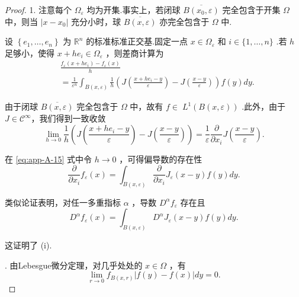 \begin{proof}
1. 注意每个 ${\Omega }_{\varepsilon }$ 均为开集.事实上，若闭球 $\overline{B\left( {{x}_{0},\varepsilon }\right) }$ 完全包含于开集 $\Omega$ 中，则当 $\left| {x - {x}_{0}}\right|$ 充分小时，球 $\overline{B\left( {x,\varepsilon }\right) }$ 亦完全包含于 $\Omega$ 中.

设 $\left\{  {{e}_{1},\ldots ,{e}_{n}}\right\}$ 为 ${\mathbb{R}}^{n}$ 的标准标准正交基.固定一点 $x \in  {\Omega }_{\varepsilon }$ 和 $i \in  \{ 1,\ldots ,n\}$ .若 $h$ 足够小，使得 $x + h{e}_{i} \in  {\Omega }_{\varepsilon }$ ，则差商计算为
\begin{align}\tag{A.15}\label{eq:app-A-15}
    &\frac{{f}_{\varepsilon }\left( {x + h{e}_{i}}\right)  - {f}_{\varepsilon }\left( x\right) }{h}\\
    &= \frac{1}{{\varepsilon }^{n}}{\int }_{B\left( {x,\varepsilon }\right) }\frac{1}{h}\left(  {J\left( \frac{x + h{e}_{i} - y}{\varepsilon }\right)  - J\left( \frac{x - y}{\varepsilon }\right) }\right)  f\left( y\right) {dy}.
\end{align}

由于闭球 $\overline{B\left( {x,\varepsilon }\right) }$ 完全包含于 $\Omega$ 中，故有 $f \in \; {L}^{1}\left( {B\left( {x,\varepsilon }\right) }\right)$ .此外，由于 $J \in  {\mathcal{C}}^{\infty }$，我们得到一致收敛
\[
\mathop{\lim }\limits_{{h \rightarrow  0}}\frac{1}{h}\left(  {J\left( \frac{x + h{e}_{i} - y}{\varepsilon }\right)  - J\left( \frac{x - y}{\varepsilon }\right) }\right)   = \frac{1}{\varepsilon }\frac{\partial }{\partial {x}_{i}}J\left( \frac{x - y}{\varepsilon }\right) .
\]

在 \eqref{eq:app-A-15} 式中令 $h \rightarrow  0$ ，可得偏导数的存在性
\[
\frac{\partial }{\partial {x}_{i}}{f}_{\varepsilon }\left( x\right)  = {\int }_{B\left( {x,\varepsilon }\right) }\frac{\partial }{\partial {x}_{i}}{J}_{\varepsilon }\left( {x - y}\right) f\left( y\right) {dy}.
\]

类似论证表明，对任一多重指标 $\alpha$ ，导数 ${D}^{\alpha }{f}_{\varepsilon }$ 存在且
\[
{D}^{\alpha }{f}_{\varepsilon }\left( x\right)  = {\int }_{B\left( {x,\varepsilon }\right) }{D}^{\alpha }{J}_{\varepsilon }\left( {x - y}\right) f\left( y\right) {dy}.
\]

这证明了 (i).

. 由Lebesgue微分定理，对几乎处处的 $x \in  \Omega$ ，有
\begin{equation}\tag{A.16}\label{eq:app-A-16}
\mathop{\lim }\limits_{{r \rightarrow  0}}{f}_{B\left( {x,r}\right) }\left| {f\left( y\right)  - f\left( x\right) }\right| {dy} = 0.
\end{equation}


\end{proof}
